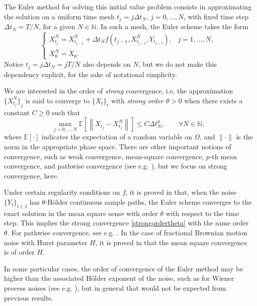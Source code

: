 \documentclass[reqno,12pt]{amsart}
\theoremstyle{plain} %
\theoremstyle{definition} %
\begin{document}
The Euler method for solving this initial value problem consists in approximating the solution on a uniform time mesh $t_j = j\Delta t_N$, $j = 0, \ldots, N$, with fixed time step $\Delta t_N = T/N$, for a given $N\in \mathbb{N}$. In such a mesh, the Euler scheme takes the form
\begin{equation}
  \label{emscheme}
  \begin{cases}
    X_{t_j}^N = X_{t_{j-1}}^N + \Delta t_N f(t_{j-1}, X_{t_{j-1}}^N, Y_{t_{j-1}}), & j = 1, \ldots, N, \\
    X_0^N = X_0.
  \end{cases}
\end{equation}
Notice $t_j = j\Delta t_N = jT/N$ also depends on $N$, but we do not make this dependency explicit, for the sake of notational simplicity.

We are interested in the order of \emph{strong} convergence, i.e. the approximation $\{X_{t_j}^N\}_j$ is said to converge to $\{X_t\}_t$ with \emph{strong order $\theta>0$} when there exists a constant $C \geq 0$ such that
\begin{equation}
    \label{strongordertheta}
    \max_{j=0, \ldots, N}\mathbb{E}\left[ \left\| X_{t_j} - X_{t_j}^N \right\| \right] \leq C \Delta t_N^\theta, \qquad \forall N \in \mathbb{N},
\end{equation}
where $\mathbb{E}[\cdot]$ indicates the expectation of a random variable on $\Omega$, and $\|\cdot\|$ is the norm in the appropriate phase space. There are other important notions of convergence, such as weak convergence, mean-square convergence, $p$-th mean convergence, and pathwise convergence (see e.g. \cite{HanKloeden2017,HighamKloeden2021, JentzenKloeden2011}), but we focus on strong convergence, here.

Under certain regularity conditions on $f$, it is proved in \cite[Theorem 3]{WangCaoHanKloeden2021} that, when the noise $\{Y_t\}_{t\in I}$ has $\theta$-H\"older continuous sample paths, the Euler scheme converges to the exact solution in the mean square sense with order $\theta$ with respect to the time step. This implies the strong convergence \eqref{strongordertheta} with the same order $\theta$. For pathwise convergence, see e.g. \cite{GruneKloeden2001,KloedenJentzen2007,JentzenKloeden2011,AsaiKloeden2016,HanKloeden2017}. In the case of fractional Brownian motion noise with Hurst parameter $H$, it is proved in \cite[Theorem 2]{WangCaoHanKloeden2021} that the mean square convergence is of order $H$.

In some particular cases, the order of convergence of the Euler method may be higher than the associated H\"older exponent of the noise, such as for Wiener process noises (see e.g. \cite[Example 5]{WangCaoHanKloeden2021}), but in general that would not be expected from previous results.
\end{document}
